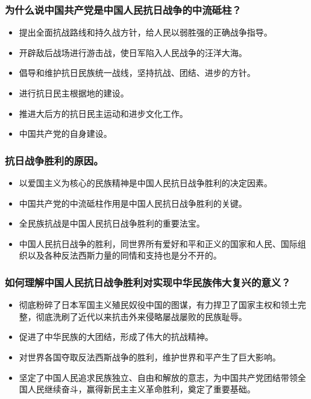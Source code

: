 \documentclass{article}
\begin{document}
\subsubsection{为什么说中国共产党是中国人民抗日战争的中流砥柱？}
\begin{itemize}
    \item 提出全面抗战路线和持久战方针，给人民以弱胜强的正确战争指导。
    \item 开辟敌后战场进行游击战，使日军陷入人民战争的汪洋大海。
    \item 倡导和维护抗日民族统一战线，坚持抗战、团结、进步的方针。
    \item 进行抗日民主根据地的建设。
    \item 推进大后方的抗日民主运动和进步文化工作。
    \item 中国共产党的自身建设。
\end{itemize}

\subsubsection{抗日战争胜利的原因。}
\begin{itemize}
    \item 以爱国主义为核心的民族精神是中国人民抗日战争胜利的决定因素。
    \item 中国共产党的中流砥柱作用是中国人民抗日战争胜利的关键。
    \item 全民族抗战是中国人民抗日战争胜利的重要法宝。
    \item 中国人民抗日战争的胜利，同世界所有爱好和平和正义的国家和人民、国际组织以及各种反法西斯力量的同情和支持也是分不开的。
\end{itemize}
    
\subsubsection{如何理解中国人民抗日战争胜利对实现中华民族伟大复兴的意义？}
\begin{itemize}
    \item 彻底粉碎了日本军国主义殖民奴役中国的图谋，有力捍卫了国家主权和领土完整，彻底洗刷了近代以来抗击外来侵略屡战屡败的民族耻辱。
    \item 促进了中华民族的大团结，形成了伟大的抗战精神。
    \item 对世界各国夺取反法西斯战争的胜利，维护世界和平产生了巨大影响。
    \item 坚定了中国人民追求民族独立、自由和解放的意志，为中国共产党团结带领全国人民继续奋斗，赢得新民主主义革命胜利，奠定了重要基础。
\end{itemize}
\end{document}
